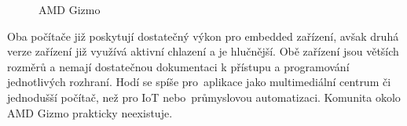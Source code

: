 \begin{figure}[!ht]
    \centering
			\hspace*{5mm}
		\caption{AMD Gizmo}
\end{figure}



	
Oba počítače již poskytují dostatečný výkon pro embedded zařízení, avšak druhá verze zařízení již využívá aktivní chlazení a je hlučnější. Obě zařízení jsou větších rozměrů a nemají dostatečnou dokumentaci k přístupu a programování jednotlivých rozhraní. Hodí se spíše pro~aplikace jako multimediální centrum či jednodušší počítač, než pro IoT nebo~průmyslovou automatizaci. Komunita okolo AMD Gizmo prakticky neexistuje.
	
	



